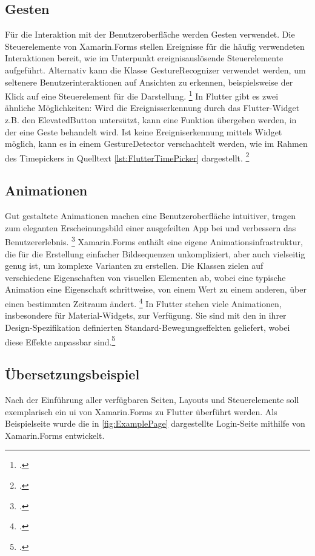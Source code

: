 \subsection{Gesten}
Für die Interaktion mit der Benutzeroberfläche werden Gesten verwendet.  Die Steuerelemente von Xamarin.Forms stellen Ereignisse für die häufig verwendeten Interaktionen bereit, wie im Unterpunkt ereignisauslösende Steuerelemente aufgeführt.  Alternativ kann die Klasse \glq GestureRecognizer\grq{}  verwendet werden, um seltenere Benutzerinteraktionen auf Ansichten zu erkennen, beispielsweise der Klick auf eine Steuerelement für die Darstellung.  \footcite[Vgl.][Abgerufen am \today]{MicrosoftGesten2020} 
In Flutter gibt es zwei ähnliche Möglichkeiten: Wird die Ereignisserkennung durch das Flutter-Widget z.B. den \glq ElevatedButton\grq{} untersützt,  kann eine Funktion übergeben werden,  in der eine Geste behandelt wird.  Ist keine Ereigniserkennung mittels Widget möglich,  kann es in einem \glq GestureDetector\grq{} verschachtelt werden, wie im Rahmen des \glq Timepickers\grq{} in Quelltext \ref{lst:FlutterTimePicker} dargestellt. \footcite[Vgl.][Abgerufen am \today]{GoogleGesture2020} 

\subsection{Animationen}
Gut gestaltete Animationen machen eine Benutzeroberfläche intuitiver, tragen zum eleganten Erscheinungsbild einer ausgefeilten App bei und verbessern das Benutzererlebnis.  \footcite[Vgl.][Abgerufen am \today]{GoogleFlutterAnimations2020} 
Xamarin.Forms enthält eine eigene Animationsinfrastruktur,  die für die Erstellung einfacher Bildsequenzen unkompliziert,  aber auch vielseitig genug ist,  um komplexe Varianten zu erstellen.  Die Klassen zielen auf verschiedene Eigenschaften von visuellen Elementen ab, wobei eine typische Animation eine Eigenschaft schrittweise, von einem Wert zu einem anderen, über einen bestimmten Zeitraum ändert. \footcite[Vgl.][Abgerufen am \today]{Microsoftanimations2020} 
In Flutter stehen viele Animationen,  insbesondere für Material-Widgets,  zur Verfügung.  Sie sind mit den in ihrer Design-Spezifikation definierten Standard-Bewegungseffekten geliefert,  wobei diese Effekte anpassbar sind.\footcite[Vgl.][Abgerufen am \today]{GoogleFlutterAnimations2020} 

\subsection{Übersetzungsbeispiel}
Nach der Einführung aller verfügbaren Seiten,  Layouts und Steuerelemente soll exemplarisch ein \ac{ui} von Xamarin.Forms zu Flutter überführt werden.  Als Beispielseite wurde die in \ref{fig:ExamplePage} dargestellte Login-Seite mithilfe von Xamarin.Forms entwickelt.  

